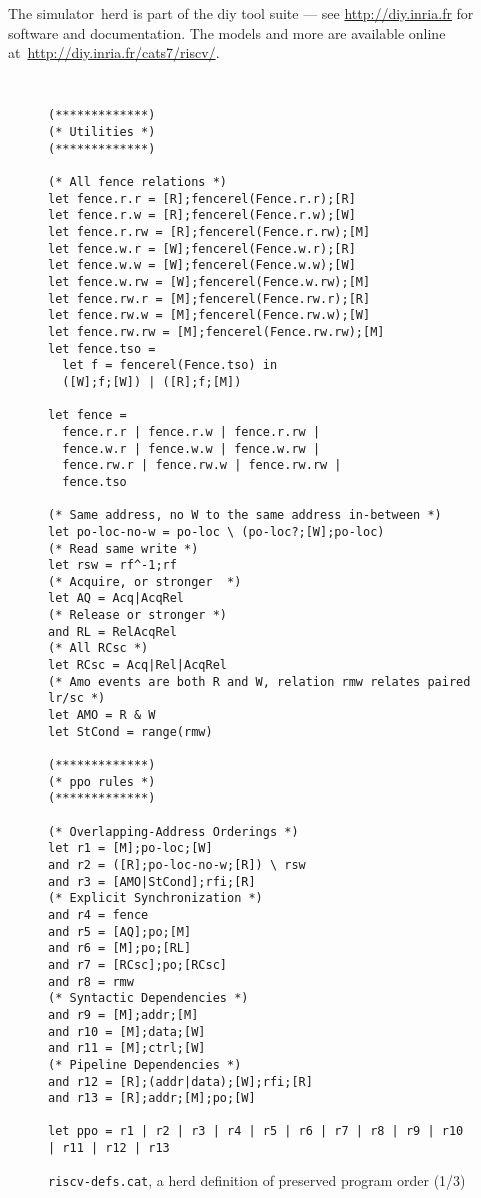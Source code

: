 The simulator~\textsf{herd} is part of the \textsf{diy} tool suite --- see \url{http://diy.inria.fr} for software and documentation. The models and more are available online at~\url{http://diy.inria.fr/cats7/riscv/}.

\begin{figure}[h!]
  {
  \tt\bfseries\centering\footnotesize
  \begin{lstlisting}
(*************)
(* Utilities *)
(*************)

(* All fence relations *)
let fence.r.r = [R];fencerel(Fence.r.r);[R]
let fence.r.w = [R];fencerel(Fence.r.w);[W]
let fence.r.rw = [R];fencerel(Fence.r.rw);[M]
let fence.w.r = [W];fencerel(Fence.w.r);[R]
let fence.w.w = [W];fencerel(Fence.w.w);[W]
let fence.w.rw = [W];fencerel(Fence.w.rw);[M]
let fence.rw.r = [M];fencerel(Fence.rw.r);[R]
let fence.rw.w = [M];fencerel(Fence.rw.w);[W]
let fence.rw.rw = [M];fencerel(Fence.rw.rw);[M]
let fence.tso =
  let f = fencerel(Fence.tso) in
  ([W];f;[W]) | ([R];f;[M])

let fence = 
  fence.r.r | fence.r.w | fence.r.rw |
  fence.w.r | fence.w.w | fence.w.rw |
  fence.rw.r | fence.rw.w | fence.rw.rw |
  fence.tso

(* Same address, no W to the same address in-between *)
let po-loc-no-w = po-loc \ (po-loc?;[W];po-loc)
(* Read same write *)
let rsw = rf^-1;rf
(* Acquire, or stronger  *)
let AQ = Acq|AcqRel
(* Release or stronger *)
and RL = RelAcqRel
(* All RCsc *)
let RCsc = Acq|Rel|AcqRel
(* Amo events are both R and W, relation rmw relates paired lr/sc *)
let AMO = R & W
let StCond = range(rmw)

(*************)
(* ppo rules *)
(*************)

(* Overlapping-Address Orderings *)
let r1 = [M];po-loc;[W]
and r2 = ([R];po-loc-no-w;[R]) \ rsw
and r3 = [AMO|StCond];rfi;[R]
(* Explicit Synchronization *)
and r4 = fence
and r5 = [AQ];po;[M]
and r6 = [M];po;[RL]
and r7 = [RCsc];po;[RCsc]
and r8 = rmw
(* Syntactic Dependencies *)
and r9 = [M];addr;[M]
and r10 = [M];data;[W]
and r11 = [M];ctrl;[W]
(* Pipeline Dependencies *)
and r12 = [R];(addr|data);[W];rfi;[R]
and r13 = [R];addr;[M];po;[W]

let ppo = r1 | r2 | r3 | r4 | r5 | r6 | r7 | r8 | r9 | r10 | r11 | r12 | r13
\end{lstlisting}
  }
  \caption{{\tt riscv-defs.cat}, a herd definition of preserved program order (1/3)}
  \label{fig:herd1}
\end{figure}

